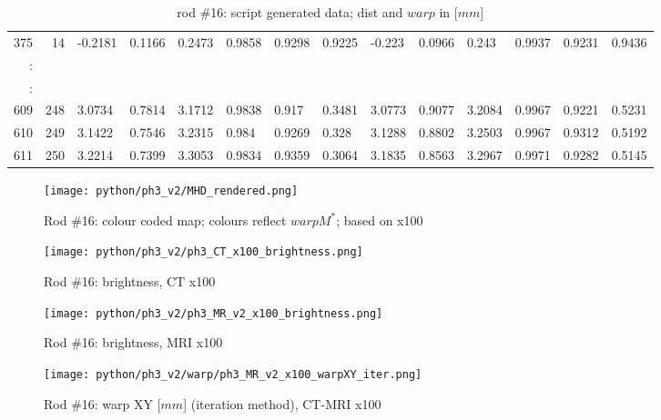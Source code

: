 \begin{table}[p]
{\begin{minipage}{\textheight}
\begin{tabular}{rr||lll|lll||lll|lll}
375    & 14   & -0.2181 & 0.1166  & 0.2473 & 0.9858 & 0.9298 & 0.9225 & -0.223  & 0.0966  & 0.243  & 0.9937 & 0.9231 & 0.9436 \\
:      &      &         &         &        &        &        &        &         &         &        &        &        &        \\
\hline
:      &      &         &         &        &        &        &        &         &         &        &        &        &        \\
609    & 248  & 3.0734  & 0.7814  & 3.1712 & 0.9838 & 0.917  & 0.3481 & 3.0773  & 0.9077  & 3.2084 & 0.9967 & 0.9221 & 0.5231 \\
610    & 249  & 3.1422  & 0.7546  & 3.2315 & 0.984  & 0.9269 & 0.328  & 3.1288  & 0.8802  & 3.2503 & 0.9967 & 0.9312 & 0.5192 \\
611    & 250  & 3.2214  & 0.7399  & 3.3053 & 0.9834 & 0.9359 & 0.3064 & 3.1835  & 0.8563  & 3.2967 & 0.9971 & 0.9282 & 0.5145
\end{tabular}
       \caption{rod \#16: script generated data; dist and $warp$ in [$mm$]}
       \label{tab:spit-out-16}
     \end{minipage}
   }
 \end{table}

\begin{figure}[!htb]
     \centering
     \texttt{[image: python/ph3\_v2/MHD\_rendered.png]}
     \caption{Rod \#16: colour coded map; colours reflect $warpM^*$; based on x100}
     \label{fig:colour-map}
\end{figure}

\begin{figure}[!thb]
    \centering
    \texttt{[image: python/ph3\_v2/ph3\_CT\_x100\_brightness.png]}
    \caption{Rod \#16: brightness, CT x100}
    \label{fig:ph3_CT_x100_brightness}
\end{figure}

\begin{figure}[!tbh]
    \centering
    \texttt{[image: python/ph3\_v2/ph3\_MR\_v2\_x100\_brightness.png]}
    \caption{Rod \#16: brightness, MRI x100}
    \label{fig:ph3_MR_x100_brightness}
\end{figure}


\begin{figure}[!hbt]
  \centering
  \texttt{[image: python/ph3\_v2/warp/ph3\_MR\_v2\_x100\_warpXY\_iter.png]}
  \caption{Rod \#16: warp XY [$mm$] (iteration method), CT-MRI x100}
  \label{fig:ph3_warpXY_x100}
\end{figure}

